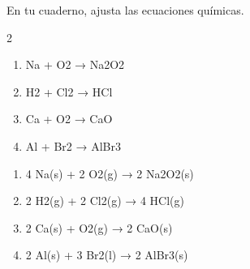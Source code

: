 \begin{exercise}
    En tu cuaderno, ajusta las ecuaciones químicas.
    \begin{multicols}{2}
        \begin{enumerate}[label=\letraminuscula]
            \item
            \begin{reaction*}
                Na\sld{} + O2\gas{}  → Na2O2\sld{}
            \end{reaction*}
            \item
            \begin{reaction*}
                H2 \gas{} + Cl2\gas{} → HCl\gas{}
            \end{reaction*}
            \item
            \begin{reaction*}
                Ca\sld{} + O2\gas{} → CaO\sld{}
            \end{reaction*}
            \item
            \begin{reaction*}
                Al\sld{} + Br2\lqd{} → AlBr3\sld{}
            \end{reaction*}
        \end{enumerate}
    \end{multicols}
    \begin{solu}
        \begin{enumerate}[label=\letraminuscula]
            \item
            \begin{reaction*}
                4 Na(s) + 2 O2(g) → 2 Na2O2(s)
            \end{reaction*}
            \item
            \begin{reaction*}
                2 H2(g) + 2 Cl2(g) → 4 HCl(g)
            \end{reaction*}
            \item
            \begin{reaction*}
                2 Ca(s) + O2(g) → 2 CaO(s)
            \end{reaction*}
            \item
            \begin{reaction*}
                2 Al(s) + 3 Br2(l) → 2 AlBr3(s)
            \end{reaction*}
        \end{enumerate}
    \end{solu}
\end{exercise}

